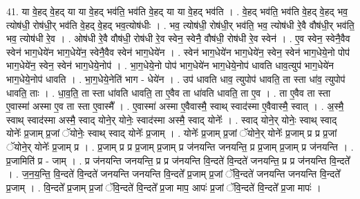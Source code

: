 \documentclass[17pt]{extarticle}
\begin{document}
41. या वे॒हद् वे॒हद् या या वे॒हद् भव॑ति॒ भव॑ति वे॒हद् या या वे॒हद् भव॑ति । . वे॒हद् भव॑ति॒ भव॑ति वे॒हद् वे॒हद् भव॒ त्योष॑धी॒ रोष॑धी॒र् भव॑ति वे॒हद् वे॒हद् भव॒त्योष॑धीः । . भव॒ त्योष॑धी॒ रोष॑धी॒र् भव॑ति॒ भव॒ त्योष॑धी रे॒वै वौष॑धी॒र् भव॑ति॒ भव॒ त्योष॑धी रे॒व । . ओष॑धी रे॒वै वौष॑धी॒ रोष॑धी रे॒व स्वेन॒ स्वेनै॒ वौष॑धी॒ रोष॑धी रे॒व स्वेन॑ । . ए॒व स्वेन॒ स्वेनै॒वैव स्वेन॑ भाग॒धेये॑न भाग॒धेये॑न॒ स्वेनै॒वैव स्वेन॑ भाग॒धेये॑न । . स्वेन॑ भाग॒धेये॑न भाग॒धेये॑न॒ स्वेन॒ स्वेन॑ भाग॒धेये॒नो पोप॑ भाग॒धेये॑न॒ स्वेन॒ स्वेन॑ भाग॒धेये॒नोप॑ । . भा॒ग॒धेये॒नो पोप॑ भाग॒धेये॑न भाग॒धेये॒नोप॑ धावति धाव॒त्युप॑ भाग॒धेये॑न भाग॒धेये॒नोप॑ धावति । . भा॒ग॒धेये॒नेति॑ भाग - धेये॑न । . उप॑ धावति धाव॒ त्युपोप॑ धावति॒ ता स्ता धा॑व॒ त्युपोप॑ धावति॒ ताः । . धा॒व॒ति॒ ता स्ता धा॑वति धावति॒ ता ए॒वैव ता धा॑वति धावति॒ ता ए॒व । . ता ए॒वैव ता स्ता ए॒वास्मा॑ अस्मा ए॒व ता स्ता ए॒वास्मै᳚ । . ए॒वास्मा॑ अस्मा ए॒वैवास्मै॒ स्वाथ् स्वाद॑स्मा ए॒वैवास्मै॒ स्वात् । . अ॒स्मै॒ स्वाथ् स्वाद॑स्मा अस्मै॒ स्वाद् योने॒र् योनेः॒ स्वाद॑स्मा अस्मै॒ स्वाद् योनेः᳚ । . स्वाद् योने॒र् योनेः॒ स्वाथ् स्वाद् योनेः᳚ प्र॒जाम् प्र॒जां ॅयोनेः॒ स्वाथ् स्वाद् योनेः᳚ प्र॒जाम् । . योनेः᳚ प्र॒जाम् प्र॒जां ॅयोने॒र् योनेः᳚ प्र॒जाम् प्र प्र प्र॒जां ॅयोने॒र् योनेः᳚ प्र॒जाम् प्र । . प्र॒जाम् प्र प्र प्र॒जाम् प्र॒जाम् प्र ज॑नयन्ति जनयन्ति॒ प्र प्र॒जाम् प्र॒जाम् प्र ज॑नयन्ति । . प्र॒जामिति॑ प्र - जाम् । . प्र ज॑नयन्ति जनयन्ति॒ प्र प्र ज॑नयन्ति वि॒न्दते॑ वि॒न्दते॑ जनयन्ति॒ प्र प्र ज॑नयन्ति वि॒न्दते᳚ । . ज॒न॒य॒न्ति॒ वि॒न्दते॑ वि॒न्दते॑ जनयन्ति जनयन्ति वि॒न्दते᳚ प्र॒जाम् प्र॒जां ॅवि॒न्दते॑ जनयन्ति जनयन्ति वि॒न्दते᳚ प्र॒जाम् । . वि॒न्दते᳚ प्र॒जाम् प्र॒जां ॅवि॒न्दते॑ वि॒न्दते᳚ प्र॒जा माप॒ आपः॑ प्र॒जां ॅवि॒न्दते॑ वि॒न्दते᳚ प्र॒जा मापः॑ । \newline
\pagebreak
{}
\end{document}
